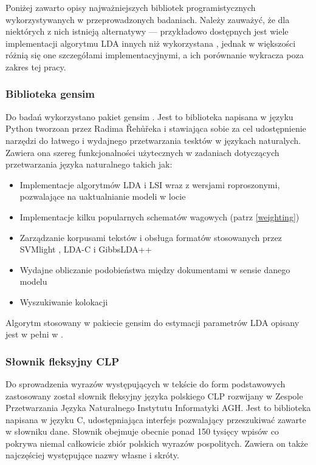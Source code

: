 \documentclass[11pt,a4paper]{article}
\begin{document}
Poniżej zawarto opisy najważniejszych bibliotek programistycznych
wykorzystywanych w przeprowadzonych badaniach. Należy zauważyć, że dla
niektórych z nich istnieją alternatywy --- przykładowo dostępnych jest wiele
implementacji algorytmu LDA innych niż wykorzystana
\cite{svmlight,lda-c,gibbs-lda}, jednak w większości różnią się one szczegółami
implementacyjnymi, a ich porównanie wykracza poza zakres tej pracy.

\subsubsection{Biblioteka gensim}
Do badań wykorzystano pakiet gensim \cite{gensim}. Jest to biblioteka napisana
w języku Python tworzoan przez Radima Řehůřeka i stawiająca sobie za cel
udostępnienie narzędzi do łatwego i wydajnego przetwarzania tesktów w językach
naturalych. Zawiera ona szereg funkcjonalności użytecznych w zadaniach
dotyczących przetwarzania języka naturalnego takich jak:

\begin{itemize}
\item Implementacje algorytmów LDA i LSI wraz z wersjami roproszonymi, pozwalające na uaktualnianie modeli w locie
\item Implementacje kilku popularnych schematów wagowych (patrz \ref{weighting})
\item Zarządzanie korpusami tekstów i obsługa formatów stosowanych przez SVMlight \cite{svmlight},
LDA-C \cite{lda-c} i GibbsLDA++ \cite{gibbs-lda}
\item Wydajne obliczanie podobieństwa między dokumentami w sensie danego modelu
\item Wyszukiwanie kolokacji
\end{itemize}

Algorytm stosowany w pakiecie gensim do estymacji parametrów LDA opisany jest
w pełni w \cite{gensim-algorithm}.

\subsubsection{Słownik fleksyjny CLP}
\label{sec:clp}

Do sprowadzenia wyrazów występujących w tekście do form podstawowych
zastosowany został słownik fleksyjny języka polskiego CLP
\cite{gajecki-slownik} rozwijany w Zespole Przetwarzania Języka Naturalnego
Instytutu Informatyki AGH. Jest to biblioteka napisana w języku C,
udostępniająca interfejs pozwalający przeszukiwać zawarte w słowniku dane.
Słownik obejmuje obecnie ponad 150 tysięcy wpisów co pokrywa niemal całkowicie
zbiór polskich wyrazów pospolitych. Zawiera on także najczęściej występujące
nazwy własne i skróty.
\end{document}
